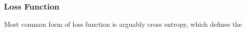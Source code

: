\subsubsection{Loss Function}

Most common form of loss function is arguably cross entropy, which defines the 